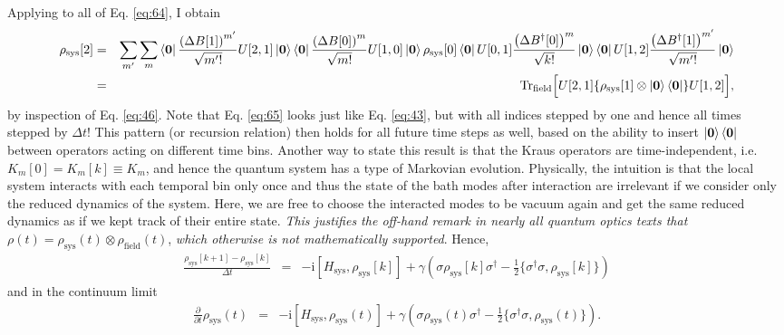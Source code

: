 \documentclass[%
 onecolumn,
 notitlepage,
 longbibliography,
 amsmath,amssymb,
 aps,
 pra,
 10pt,
]{revtex4-1}
\begin{document}
Applying to all of Eq. \ref{eq:64}, I obtain
\begin{eqnarray}
\rho_\text{sys}[2]&=&\sum_{m'}\sum_m \bra{\mathbf{0}}\frac{\left(\Delta B[1]\right)^{m'}}{\sqrt{m'!}} U[2,1]\ket{\mathbf{0}}\bra{\mathbf{0}}\frac{\left(\Delta B[0]\right)^m}{\sqrt{m!}} U[1,0]\ket{\mathbf{0}}\rho_\text{sys}[0]\bra{\mathbf{0}}U[0,1]\frac{\left(\Delta B^\dagger[0]\right)^m}{\sqrt{k!}}\ket{\mathbf{0}}\bra{\mathbf{0}}U[1,2]\frac{\left(\Delta B^\dagger[1]\right)^{m'}}{\sqrt{m'!}}\ket{\mathbf{0}}\nonumber\\
&=&\text{Tr}_\text{field}\Big[U[2,1]\{\rho_\text{sys}[1]\otimes\ket{\mathbf{0}}\bra{\mathbf{0}}\}U[1,2]\Big]\label{eq:65},
\end{eqnarray}
by inspection of Eq. \ref{eq:46}. Note that Eq. \ref{eq:65} looks just like Eq. \ref{eq:43}, but with all indices stepped by one and hence all times stepped by $\Delta t$! This pattern (or recursion relation) then holds for all future time steps as well, based on the ability to insert $\ket{\mathbf{0}}\bra{\mathbf{0}}$ between operators acting on different time bins. Another way to state this result is that the Kraus operators are time-independent, i.e. $K_{m}[0]=K_{m}[k]\equiv K_m$, and hence the quantum system has a type of Markovian evolution. Physically, the intuition is that the local system interacts with each temporal bin only once and thus the state of the bath modes after interaction are irrelevant if we consider only the reduced dynamics of the system. Here, we are free to choose the interacted modes to be vacuum again and get the same reduced dynamics as if we kept track of their entire state. \textit{This justifies the off-hand remark in nearly all quantum optics texts that} $\rho(t)=\rho_\text{sys}(t)\otimes\rho_\text{field}(t)$, \textit{which otherwise is not mathematically supported}. Hence,
\begin{eqnarray}
\frac{\rho_\text{sys}[k+1]-\rho_\text{sys}[k]}{\Delta t}&=&-\text{i}\left[H_\text{sys}, \rho_\text{sys}[k]\right] + \gamma\left(\sigma \rho_\text{sys}[k]\sigma^\dagger-\frac{1}{2}\{\sigma^\dagger\sigma,\rho_\text{sys}[k]\}\right)
\end{eqnarray}
and in the continuum limit
\begin{eqnarray}
\frac{\partial}{\partial t}\rho_\text{sys}(t)&=&-\text{i}\left[H_\text{sys}, \rho_\text{sys}(t)\right] + \gamma\left(\sigma \rho_\text{sys}(t)\sigma^\dagger-\frac{1}{2}\{\sigma^\dagger\sigma,\rho_\text{sys}(t)\}\right).\\
\end{eqnarray}
\end{document}
